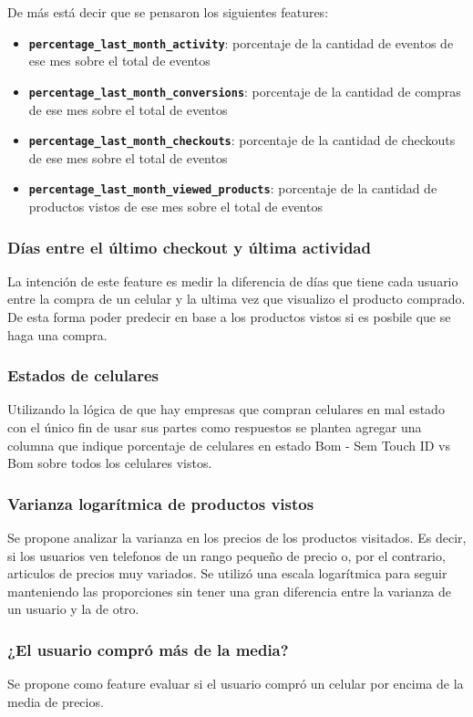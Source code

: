 \documentclass[a4paper]{article}
\begin{document}
De más está decir que se pensaron los siguientes features:
\begin{itemize}
	\item \textbf{\texttt{percentage\_last\_month\_activity}}: porcentaje de la cantidad de eventos de ese mes sobre el total de eventos
	\item \textbf{\texttt{percentage\_last\_month\_conversions}}:  porcentaje de la cantidad de compras de ese mes sobre el total de eventos
	\item \textbf{\texttt{percentage\_last\_month\_checkouts}}: porcentaje de la cantidad de checkouts de ese mes sobre el total de eventos
	\item \textbf{\texttt{percentage\_last\_month\_viewed\_products}}: porcentaje de la cantidad de productos vistos de ese mes sobre el total de eventos
\end{itemize}

\subsubsection{Días entre el último checkout y última actividad}
La intención de este feature es medir la diferencia de días que tiene cada usuario entre la compra de un celular y la ultima vez que visualizo el producto comprado. De esta forma poder predecir en base a los productos vistos si es posbile que se haga una compra.

\subsubsection{Estados de celulares}
Utilizando la lógica de que hay empresas que compran celulares en mal estado con el único fin de usar sus partes como respuestos se plantea agregar una columna que indique porcentaje de celulares en estado Bom - Sem Touch ID vs Bom sobre todos los celulares vistos.

\subsubsection{Varianza logarítmica de productos vistos}
Se propone analizar la varianza en los precios de los productos visitados. Es decir, si los usuarios ven telefonos de un rango pequeño de precio o, por el contrario, articulos de precios muy variados. Se utilizó una escala logarítmica para seguir manteniendo las proporciones sin tener una gran diferencia entre la varianza de un usuario y la de otro.

\subsubsection{¿El usuario compró más de la media?}
Se propone como feature evaluar si el usuario compró un celular por encima de la media de precios. 
\end{document}
